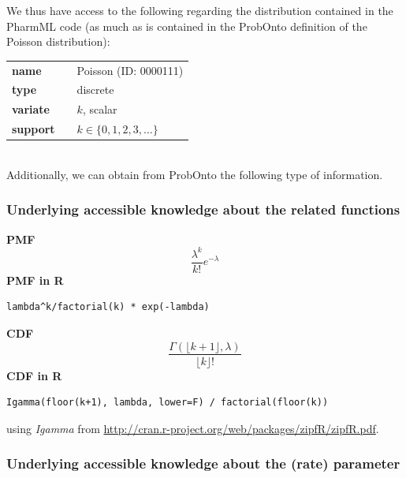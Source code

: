 {We thus have access to the following regarding the distribution contained in the PharmML code (as much as is contained in the ProbOnto definition of the Poisson distribution):

\bigskip
\begin{tabular}{p{2cm}cl}
\textbf{name} & & Poisson (ID: 0000111)\\

\textbf{type} & & discrete \\

\textbf{variate} & & $k$, scalar \\

\textbf{support} & & $k \in \{0,1,2,3,\dots\}$
\end{tabular}
\bigskip \\
Additionally, we can obtain from ProbOnto the following type of information. 
\subsubsection*{Underlying accessible knowledge about the related functions}
\smallskip \noindent \hspace{.2cm} \textbf{PMF}
\begin{equation*}\frac{\lambda^k}{k!}e^{-\lambda}\end{equation*}
\smallskip \noindent \hspace{.2cm} \textbf{PMF in R}
\begin{verbatim}lambda^k/factorial(k) * exp(-lambda)\end{verbatim}
\smallskip \noindent \hspace{.2cm} \textbf{CDF}
\begin{equation*}\frac{\Gamma(\lfloor k+1 \rfloor,\lambda)}{\lfloor k \rfloor!}\end{equation*}
\smallskip \noindent \hspace{.2cm} \textbf{CDF in R}
\begin{verbatim}Igamma(floor(k+1), lambda, lower=F) / factorial(floor(k))\end{verbatim}
using \emph{Igamma} from \url{http://cran.r-project.org/web/packages/zipfR/zipfR.pdf}.

\subsubsection*{Underlying accessible knowledge about the (rate) parameter}

}
